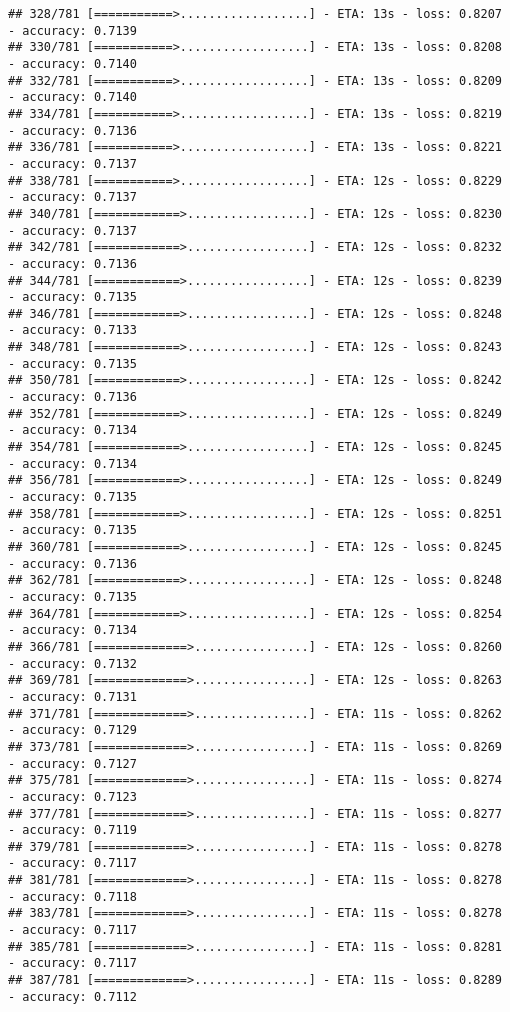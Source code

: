 \documentclass[
]{article}
\begin{document}
\begin{verbatim}
## 328/781 [===========>..................] - ETA: 13s - loss: 0.8207 - accuracy: 0.7139
## 330/781 [===========>..................] - ETA: 13s - loss: 0.8208 - accuracy: 0.7140
## 332/781 [===========>..................] - ETA: 13s - loss: 0.8209 - accuracy: 0.7140
## 334/781 [===========>..................] - ETA: 13s - loss: 0.8219 - accuracy: 0.7136
## 336/781 [===========>..................] - ETA: 13s - loss: 0.8221 - accuracy: 0.7137
## 338/781 [===========>..................] - ETA: 12s - loss: 0.8229 - accuracy: 0.7137
## 340/781 [============>.................] - ETA: 12s - loss: 0.8230 - accuracy: 0.7137
## 342/781 [============>.................] - ETA: 12s - loss: 0.8232 - accuracy: 0.7136
## 344/781 [============>.................] - ETA: 12s - loss: 0.8239 - accuracy: 0.7135
## 346/781 [============>.................] - ETA: 12s - loss: 0.8248 - accuracy: 0.7133
## 348/781 [============>.................] - ETA: 12s - loss: 0.8243 - accuracy: 0.7135
## 350/781 [============>.................] - ETA: 12s - loss: 0.8242 - accuracy: 0.7136
## 352/781 [============>.................] - ETA: 12s - loss: 0.8249 - accuracy: 0.7134
## 354/781 [============>.................] - ETA: 12s - loss: 0.8245 - accuracy: 0.7134
## 356/781 [============>.................] - ETA: 12s - loss: 0.8249 - accuracy: 0.7135
## 358/781 [============>.................] - ETA: 12s - loss: 0.8251 - accuracy: 0.7135
## 360/781 [============>.................] - ETA: 12s - loss: 0.8245 - accuracy: 0.7136
## 362/781 [============>.................] - ETA: 12s - loss: 0.8248 - accuracy: 0.7135
## 364/781 [============>.................] - ETA: 12s - loss: 0.8254 - accuracy: 0.7134
## 366/781 [=============>................] - ETA: 12s - loss: 0.8260 - accuracy: 0.7132
## 369/781 [=============>................] - ETA: 12s - loss: 0.8263 - accuracy: 0.7131
## 371/781 [=============>................] - ETA: 11s - loss: 0.8262 - accuracy: 0.7129
## 373/781 [=============>................] - ETA: 11s - loss: 0.8269 - accuracy: 0.7127
## 375/781 [=============>................] - ETA: 11s - loss: 0.8274 - accuracy: 0.7123
## 377/781 [=============>................] - ETA: 11s - loss: 0.8277 - accuracy: 0.7119
## 379/781 [=============>................] - ETA: 11s - loss: 0.8278 - accuracy: 0.7117
## 381/781 [=============>................] - ETA: 11s - loss: 0.8278 - accuracy: 0.7118
## 383/781 [=============>................] - ETA: 11s - loss: 0.8278 - accuracy: 0.7117
## 385/781 [=============>................] - ETA: 11s - loss: 0.8281 - accuracy: 0.7117
## 387/781 [=============>................] - ETA: 11s - loss: 0.8289 - accuracy: 0.7112

\end{verbatim}
\end{document}
